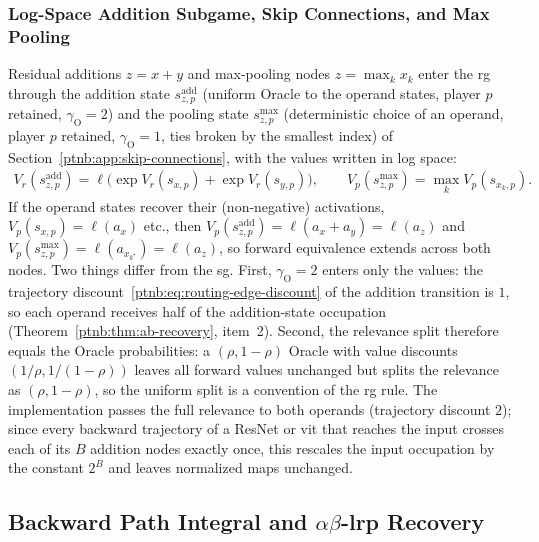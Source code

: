 \subsubsection{Log-Space Addition Subgame, Skip Connections, and Max
Pooling}\label{ptnb:app:routing-skip}

Residual additions $z = x + y$ and max-pooling nodes $z = \max_k x_k$ enter the \ac{rg} through the
addition state $s^{\mathrm{add}}_{z,p}$ (uniform Oracle to the operand states, player $p$ retained,
$\gamma_{\mathrm{O}} = 2$) and the pooling state $s^{\max}_{z,p}$ (deterministic choice of an
operand, player $p$ retained, $\gamma_{\mathrm{O}} = 1$, ties broken by the smallest index) of
Section~\ref{ptnb:app:skip-connections}, with the values written in log space:
\begin{align}\label{ptnb:eq:routing-add-max}
    V_r(s^{\mathrm{add}}_{z,p}) = \ell\bigl(\exp V_r(s_{x,p}) + \exp V_r(s_{y,p})\bigr),
    \qquad
    V_p(s^{\max}_{z,p}) = \max_k V_p(s_{x_k,p}).
\end{align}
If the operand states recover their (non-negative) activations, $V_p(s_{x,p}) = \ell(a_x)$ etc.,
then $V_p(s^{\mathrm{add}}_{z,p}) = \ell(a_x + a_y) = \ell(a_z)$ and $V_p(s^{\max}_{z,p}) =
    \ell(a_{x_{k^\star}}) = \ell(a_z)$, so forward equivalence extends across both nodes. Two things
differ from the \ac{sg}. First, $\gamma_{\mathrm{O}} = 2$ enters only the values: the trajectory
discount~\eqref{ptnb:eq:routing-edge-discount} of the addition transition is $1$, so each operand
receives half of the addition-state occupation (Theorem~\ref{ptnb:thm:ab-recovery}, item~2). Second, the
relevance split therefore equals the Oracle probabilities: a $(\rho, 1-\rho)$ Oracle with value
discounts $(1/\rho, 1/(1-\rho))$ leaves all forward values unchanged but splits the relevance as
$(\rho, 1-\rho)$, so the uniform split is a convention of the \ac{rg} rule. The implementation
passes the full relevance to both operands (trajectory discount $2$); since every backward
trajectory of a ResNet or \ac{vit} that reaches the input crosses each of its $B$ addition nodes
exactly once, this rescales the input occupation by the constant $2^B$ and leaves normalized maps
unchanged.

\subsection{Backward Path Integral and \texorpdfstring{$\alpha\beta$-\ac{lrp} Recovery}{alpha-beta LRP Recovery}}\label{ptnb:app:routing-attribution}


